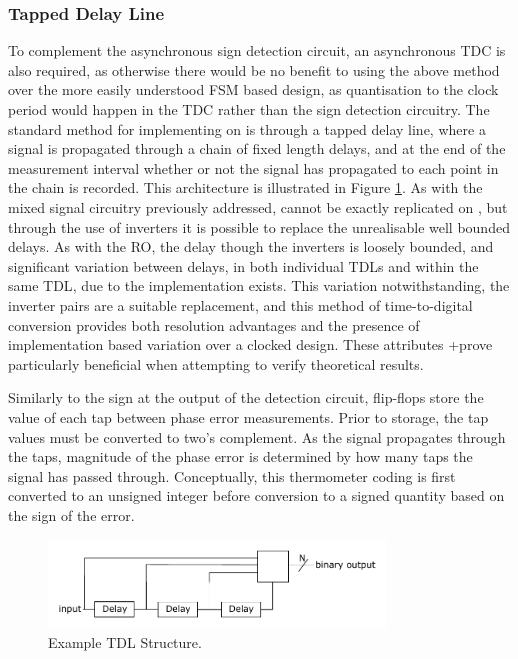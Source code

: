 \subsubsection{Tapped Delay Line}
To complement the asynchronous sign detection circuit, an asynchronous \ac{TDC} is also required, as otherwise there would be no benefit to using the above method over the more easily understood \ac{FSM} based design, as quantisation to the clock period would happen in the \ac{TDC} rather than the sign detection circuitry. The standard method for implementing  on  is through a tapped delay line, where a signal is propagated through a chain of fixed length delays, and at the end of the measurement interval whether or not the signal has propagated to each point in the chain is recorded. This architecture is illustrated in Figure \ref{fig:simple_tdc}. As with the mixed signal circuitry previously addressed,  cannot be exactly replicated on , but through the use of inverters it is possible to replace the unrealisable well bounded delays. As with the \ac{RO}, the delay though the inverters is loosely bounded, and significant variation between delays, in both individual \acp{TDL} and within the same \ac{TDL}, due to the implementation exists. This variation notwithstanding, the inverter pairs are a suitable replacement, and this method of time-to-digital conversion provides both resolution advantages and the presence of implementation based variation over a clocked design. These attributes +prove particularly beneficial when attempting to verify theoretical results.

Similarly to the sign at the output of the detection circuit, flip-flops store the value of each tap between phase error measurements. Prior to storage, the tap values must be converted to two's complement. As the signal propagates through the taps, magnitude of the phase error is determined by how many taps the signal has passed through. Conceptually, this thermometer coding is first converted to an unsigned integer before conversion to a signed quantity based on the sign of the error.
\begin{figure}[h]
	\centering
	\includegraphics[width=0.8\textwidth]{../simple_tdc}
	\caption[Example \acl{TDL} Structure]{Example \acl{TDL} Structure.}
	\label{fig:simple_tdc}
\end{figure}

